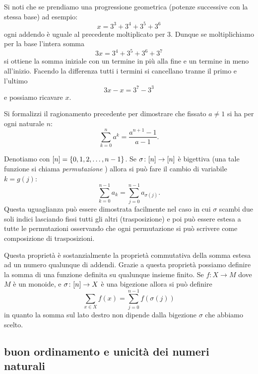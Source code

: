 \begin{exercise}
  \label{ex:somma_geometrica}%
Si noti che se prendiamo una progressione geometrica 
(potenze successive con la stessa base) 
ad esempio:
\[
  x = 3^3 + 3^4 + 3^5 + 3^6
\]
ogni addendo è uguale al precedente moltiplicato per $3$.
Dunque se moltiplichiamo per la base l'intera somma
\[
  3x = 3^4 + 3^5 + 3^6 + 3^7
\]
si ottiene la somma iniziale con un termine in più alla fine 
e un termine in meno all'inizio. 
Facendo la differenza tutti i termini si cancellano tranne 
il primo e l'ultimo
\[
 3x - x = 3^7 - 3^3  
\]
e possiamo ricavare $x$.

Si formalizzi il ragionamento precedente per dimostrare che 
fissato $a\neq 1$ si ha per ogni naturale $n$:
  \[
    \sum_{k=0}^n a^k = \frac{a^{n+1}-1}{a-1}.
  \] 
\end{exercise}

Denotiamo con ${\left[ n \right]} = {\left\{ 0,1,2, \dots, n-1 \right\}}$.
Se $\sigma\colon {\left[ n \right]} \to {\left[ n \right]}$
è bigettiva (una tale funzione si chiama \emph{permutazione}%
%
)
allora si può fare il cambio di variabile $k=g(j)$:
\[
    \sum_{k=0}^{n-1} a_k = \sum_{j=0}^{n-1} a_{\sigma(j)}.
\]
Questa uguaglianza può essere dimostrata facilmente nel caso 
in cui $\sigma$ scambi due soli indici lasciando fissi tutti gli altri 
(trasposizione) e poi può essere estesa a tutte le permutazioni
osservando che ogni permutazione si può scrivere come composizione 
di trasposizioni.

Questa proprietà è sostanzialmente la proprietà commutativa della somma 
estesa ad un numero qualunque di addendi.
Grazie a questa proprietà possiamo definire la somma di una funzione 
definita su qualunque insieme finito. 
Se $f\colon X \to M$
dove $M$ è un monoide, 
e $\sigma\colon {\left[ n \right]} \to X$ è una bigezione
allora si può definire 
\[
  \sum_{x\in X} f(x) = \sum_{j=0}^{n-1} f(\sigma(j))  
\]
in quanto la somma sul lato destro non dipende dalla bigezione $\sigma$ che 
abbiamo scelto.


\subsection{buon ordinamento e unicità dei numeri naturali}

